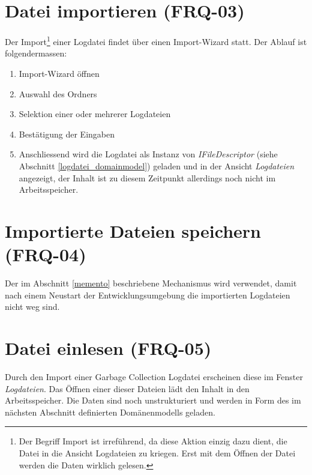 \section{Datei importieren (FRQ-03)}
Der Import\footnote{Der Begriff Import ist irreführend, da diese Aktion einzig dazu dient, die Datei in die Ansicht Logdateien zu kriegen. Erst mit dem Öffnen der Datei werden die Daten wirklich gelesen.} einer Logdatei findet über einen Import-Wizard statt. Der Ablauf ist folgendermassen:
\begin{enumerate}
	\item Import-Wizard öffnen
	\item Auswahl des Ordners
	\item Selektion einer oder mehrerer Logdateien
	\item Bestätigung der Eingaben
	\item Anschliessend wird die Logdatei als Instanz von \textit{IFileDescriptor} (siehe Abschnitt \ref{logdatei_domainmodel}) geladen und in der Ansicht \textit{Logdateien} angezeigt, der Inhalt ist zu diesem Zeitpunkt allerdings noch nicht im Arbeitsspeicher.
\end{enumerate}

\section{Importierte Dateien speichern (FRQ-04)}
Der im Abschnitt \ref{memento} beschriebene Mechanismus wird verwendet, damit nach einem Neustart der Entwicklungsumgebung die importierten Logdateien nicht weg sind. 

\section{Datei einlesen (FRQ-05)}
Durch den Import einer Garbage Collection Logdatei erscheinen diese im Fenster \textit{Logdateien}. Das Öffnen einer dieser Dateien lädt den Inhalt in den Arbeitsspeicher. Die Daten sind noch unstrukturiert und werden in Form des im nächsten Abschnitt definierten Domänenmodells geladen.

